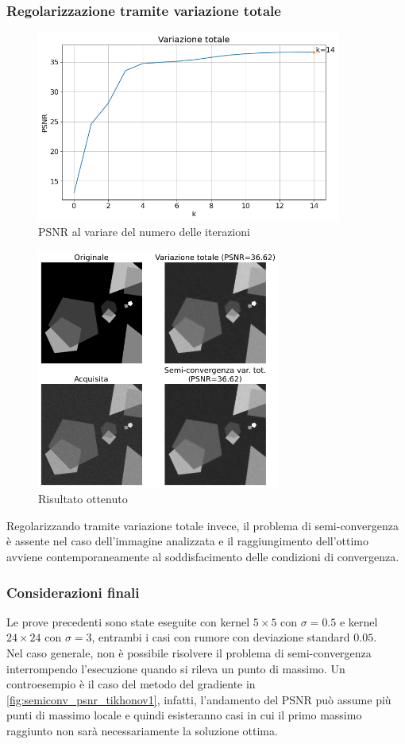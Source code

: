 \documentclass[11pt]{article}
\begin{document}
\subsubsection{Regolarizzazione tramite variazione totale}
\begin{figure}[H]
    \centering
    \includegraphics[width=10cm]{semiconvergenza/1/psnr_tv.png}
    \caption{PSNR al variare del numero delle iterazioni}
    \label{fig:semiconv_psnr_tv1}
\end{figure}
\begin{figure}[H]
    \centering
    \includegraphics[width=8cm]{semiconvergenza/1/deblur_tv.png}
    \caption{Risultato ottenuto}
    \label{fig:semiconv_deblur_tv1}
\end{figure}
Regolarizzando tramite variazione totale invece, il problema di semi-convergenza è assente nel caso dell'immagine analizzata e il raggiungimento dell'ottimo avviene contemporaneamente al soddisfacimento delle condizioni di convergenza.

\subsubsection{Considerazioni finali}
Le prove precedenti sono state eseguite con kernel $5 \times 5$ con $\sigma=0.5$ e kernel $24 \times 24$ con $\sigma=3$, entrambi i casi con rumore con deviazione standard $0.05$.\\
Nel caso generale, non è possibile risolvere il problema di semi-convergenza interrompendo l'esecuzione quando si rileva un punto di massimo. 
Un controesempio è il caso del metodo del gradiente in \autoref{fig:semiconv_psnr_tikhonov1}, infatti, l'andamento del PSNR può assume più punti di massimo locale e quindi esisteranno casi in cui il primo massimo raggiunto non sarà necessariamente la soluzione ottima.
\end{document}
